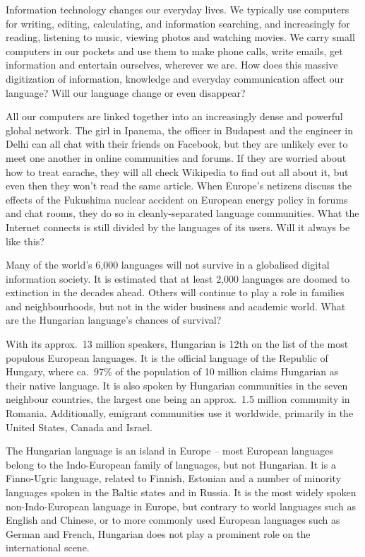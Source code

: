   \begin{multicols}{2}

  Information technology changes our everyday lives. We typically use computers for writing, editing, calculating, and information searching, and increasingly for reading, listening to music, viewing photos and watching movies. We carry small computers in our pockets and use them to make phone calls, write emails, get information and entertain ourselves, wherever we are. How does this massive digitization of information, knowledge and everyday communication affect our language? Will our language change or even disappear? 

  All our computers are linked together into an increasingly dense and powerful global network. The girl in Ipanema, the officer in Budapest and the engineer in Delhi can all chat with their friends on Facebook, but they are unlikely ever to meet one another in online communities and forums. If they are worried about how to treat earache, they will all check Wikipedia to find out all about it, but even then they won’t read the same article. When Europe's netizens discuss the effects of the Fukushima nuclear accident on European energy policy in forums and chat rooms, they do so in cleanly-separated language communities. What the Internet connects is still divided by the languages of its users. Will it always be like this? 

  Many of the world’s 6,000 languages will not survive in a globalised digital information society. It is estimated that at least 2,000 languages are doomed to extinction in the decades ahead. Others will continue to play a role in families and neighbourhoods, but not in the wider business and academic world. What are the Hungarian language’s chances of survival? 

  With its approx.~13 million speakers, Hungarian is 12th on the list of the most populous European languages. It is the official language of the Republic of Hungary, where ca.~97\% of the population of 10 million claims Hungarian as their native language. It is also spoken by Hungarian communities in the seven neighbour countries, the largest one being an approx.~1.5 million community in Romania. Additionally, emigrant communities use it worldwide, primarily in the United States, Canada and Israel.

  The Hungarian language is an island in Europe -- most European languages belong to the Indo-European family of languages, but not Hungarian. It is a Finno-Ugric language, related to Finnish, Estonian and a number of minority languages spoken in the Baltic states and in Russia. It is the most widely spoken non-Indo-European language in Europe, but contrary to world languages such as English and Chinese, or to more commonly used European languages such as German and French, Hungarian does not play a prominent role on the international scene. 


\end{multicols}
